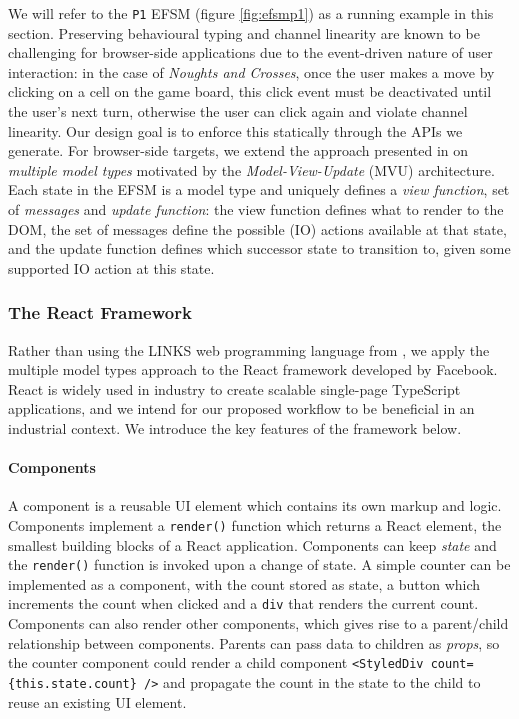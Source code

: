 \documentclass[submission,copyright,creativecommons]{eptcs}
\begin{document}
We will refer to the \texttt{P1} EFSM (figure \ref{fig:efsmp1}) as a running example in this section. Preserving behavioural typing and channel linearity are known to be challenging for browser-side applications due to the event-driven nature of user interaction: in the case of \textit{Noughts and Crosses}, once the user makes a move by clicking on a cell on the game board, this click event must be deactivated until the user's next turn, otherwise the user can click again and violate channel linearity. Our design goal is to enforce this statically through the APIs we generate. For browser-side targets, we extend the approach presented in \cite{MVU2019} on \textit{multiple model types} motivated by the \textit{Model-View-Update} (MVU) architecture. Each state in the EFSM is a model type and uniquely defines a \textit{view function}, set of \textit{messages} and \textit{update function}: the view function defines what to render to the DOM, the set of messages define the possible (IO) actions available at that state, and the update function defines which successor state to transition to, given some supported IO action at this state.

\subsubsection{The React Framework}
Rather than using the LINKS web programming language from \cite{MVU2019}, we apply the multiple model types approach to the React framework \cite{React} developed by Facebook. React is widely used in industry to create scalable single-page TypeScript applications, and we intend for our proposed workflow to be beneficial in an industrial context. We introduce the key features of the framework below.

\paragraph{Components} A component is a reusable UI element which contains its own markup and logic. Components implement a \texttt{render()} function which returns a React element, the smallest building blocks of a React application. Components can keep \textit{state} and the \texttt{render()} function is invoked upon a change of state. A simple counter can be implemented as a component, with the count stored as state, a button which increments the count when clicked and a \texttt{div} that renders the current count. Components can also render other components, which gives rise to a parent/child relationship between components. Parents can pass data to children as \textit{props}, so the counter component could render a  child component \texttt{<StyledDiv count=\{this.state.count\} />} and propagate the count in the state to the child to reuse an existing UI element.
\end{document}
